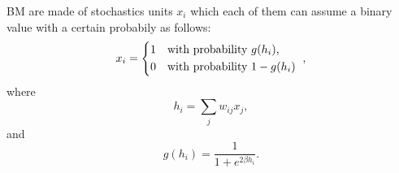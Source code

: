 BM are made of stochastics units $x_{i}$ which each of them can assume a binary value with a certain probabily as follows:
\begin{equation}
  x_{i} =
    \begin{cases*}
      1 & with probability $g(h_{i})$, \\
      0 & with probability $1 - g(h_{i})$
    \end{cases*},
  \label{eq:eq1}
\end{equation}
where
\begin{equation}
  h_{i} = \sum_{j}w_{ij}x_{j},
  \label{eq:eq2}
\end{equation}
and
\begin{equation}
  g(h_{i}) = \frac{1}{1 + e^{2 \beta h_{i}}}.
  \label{eq:eq3}
\end{equation}
